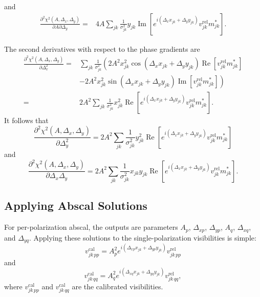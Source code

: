 \documentclass{article}
\newcommand\re{\operatorname{Re}}
\newcommand\im{\operatorname{Im}}
\begin{document}
and
\begin{equation}
\begin{split}
    \frac{\partial^2 \chi^2(A, \Delta_x, \Delta_y)}{\partial A \partial \Delta_y} =& 4A \sum_{jk} \frac{1}{\sigma_{jk}^2} y_{jk} \im[e^{i(\Delta_x x_{jk} + \Delta_y y_{jk})} v^\text{rel}_{jk} m^*_{jk}].
\end{split}
\end{equation}

The second derivatives with respect to the phase gradients are
\begin{equation}
\begin{split}
    \frac{\partial^2 \chi^2(A, \Delta_x, \Delta_y)}{\partial \Delta_x^2} =& \sum_{jk} \frac{1}{\sigma_{jk}^2} \left( 2 A^2 x^2_{jk} \cos(\Delta_x x_{jk} + \Delta_y y_{jk}) \re[v^\text{rel}_{jk} m^*_{jk}] \right. \\
    &- \left. 2 A^2 x^2_{jk} \sin(\Delta_x x_{jk} + \Delta_y y_{jk}) \im[v^\text{rel}_{jk} m^*_{jk}] \right) \\
    =& 2A^2 \sum_{jk} \frac{1}{\sigma_{jk}^2} x^2_{jk} \re[e^{i(\Delta_x x_{jk} + \Delta_y y_{jk})} v^\text{rel}_{jk} m^*_{jk}].
\end{split}
\end{equation}
It follows that
\begin{equation}
    \frac{\partial^2 \chi^2(A, \Delta_x, \Delta_y)}{\partial \Delta_y^2} = 2A^2 \sum_{jk} \frac{1}{\sigma_{jk}^2} y^2_{jk} \re[e^{i(\Delta_x x_{jk} + \Delta_y y_{jk})} v^\text{rel}_{jk} m^*_{jk}]
\end{equation}
and
\begin{equation}
    \frac{\partial^2 \chi^2(A, \Delta_x, \Delta_y)}{\partial \Delta_x \Delta_y} = 2A^2 \sum_{jk} \frac{1}{\sigma_{jk}^2} x_{jk} y_{jk} \re[e^{i(\Delta_x x_{jk} + \Delta_y y_{jk})} v^\text{rel}_{jk} m^*_{jk}].
\end{equation}

\subsection{Applying Abscal Solutions}

For per-polarization abscal, the outputs are parameters $A_p$, $\Delta_{xp}$, $\Delta_{yp}$, $A_q$, $\Delta_{xq}$, and $\Delta_{yq}$. Applying these solutions to the single-polarization visibilities is simple:
\begin{equation}
    v_{jk \, pp}^\text{cal} = A_p^2 e^{i(\Delta_{xp} x_{jk} + \Delta_{yp} y_{jk})} v^\text{rel}_{jk \, pp}
\end{equation}
and
\begin{equation}
    v_{jk \, qq}^\text{cal} = A_q^2 e^{i(\Delta_{xq} x_{jk} + \Delta_{yq} y_{jk})} v^\text{rel}_{jk \, qq},
\end{equation}
where $v_{jk \, pp}^\text{cal}$ and $v_{jk \, qq}^\text{cal}$ are the calibrated visibilities.
\end{document}
